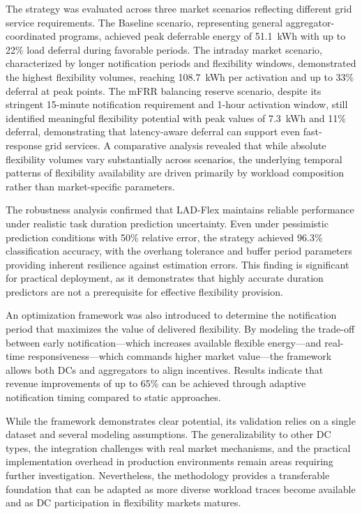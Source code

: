\documentclass[preprint,12pt]{elsarticle}
\begin{document}
The strategy was evaluated across three market scenarios reflecting different grid service requirements. The Baseline scenario, representing general aggregator-coordinated programs, achieved peak deferrable energy of 51.1~kWh with up to 22\% load deferral during favorable periods. The intraday market scenario, characterized by longer notification periods and flexibility windows, demonstrated the highest flexibility volumes, reaching 108.7~kWh per activation and up to 33\% deferral at peak points. The mFRR balancing reserve scenario, despite its stringent 15-minute notification requirement and 1-hour activation window, still identified meaningful flexibility potential with peak values of 7.3~kWh and 11\% deferral, demonstrating that latency-aware deferral can support even fast-response grid services. A comparative analysis revealed that while absolute flexibility volumes vary substantially across scenarios, the underlying temporal patterns of flexibility availability are driven primarily by workload composition rather than market-specific parameters.

The robustness analysis confirmed that LAD-Flex maintains reliable performance under realistic task duration prediction uncertainty. Even under pessimistic prediction conditions with 50\% relative error, the strategy achieved 96.3\% classification accuracy, with the overhang tolerance and buffer period parameters providing inherent resilience against estimation errors. This finding is significant for practical deployment, as it demonstrates that highly accurate duration predictors are not a prerequisite for effective flexibility provision.

An optimization framework was also introduced to determine the notification period that maximizes the value of delivered flexibility. By modeling the trade-off between early notification—which increases available flexible energy—and real-time responsiveness—which commands higher market value—the framework allows both DCs and aggregators to align incentives. Results indicate that revenue improvements of up to 65\% can be achieved through adaptive notification timing compared to static approaches.

While the framework demonstrates clear potential, its validation relies on a single dataset and several modeling assumptions. The generalizability to other DC types, the integration challenges with real market mechanisms, and the practical implementation overhead in production environments remain areas requiring further investigation. Nevertheless, the methodology provides a transferable foundation that can be adapted as more diverse workload traces become available and as DC participation in flexibility markets matures.
\end{document}
